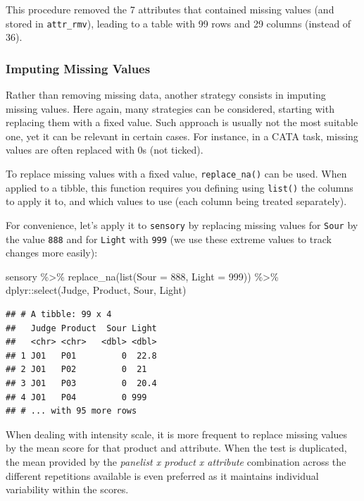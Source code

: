 \documentclass[
]{krantz}
\makeatletter
\newenvironment{Shaded}{\begin{snugshade}}{\end{snugshade}}
\newcommand{\AttributeTok}[1]{\textcolor[rgb]{0.61,0.61,0.61}{#1}}
\newcommand{\DecValTok}[1]{\textcolor[rgb]{0.06,0.06,0.06}{#1}}
\newcommand{\FunctionTok}[1]{\textcolor[rgb]{0,0,0}{#1}}
\newcommand{\NormalTok}[1]{#1}
\newcommand{\SpecialCharTok}[1]{\textcolor[rgb]{0,0,0}{#1}}
\newenvironment{kframe}{%
\medskip{}
\setlength{\fboxsep}{.8em}
 \def\at@end@of@kframe{}%
 \ifinner\ifhmode%
  \def\at@end@of@kframe{\end{minipage}}%
  \begin{minipage}{\columnwidth}%
 \fi\fi%
 \def\FrameCommand##1{\hskip\@totalleftmargin \hskip-\fboxsep
 \colorbox{shadecolor}{##1}\hskip-\fboxsep
     \hskip-\linewidth \hskip-\@totalleftmargin \hskip\columnwidth}%
 \MakeFramed {\advance\hsize-\width
   \@totalleftmargin\z@ \linewidth\hsize
   \@setminipage}}%
 {\par\unskip\endMakeFramed%
 \at@end@of@kframe}
\renewenvironment{Shaded}{\begin{kframe}}{\end{kframe}}
\makeatother
\begin{document}
This procedure removed the 7 attributes that contained missing values (and stored in \texttt{attr\_rmv}), leading to a table with 99 rows and 29 columns (instead of 36).

\hypertarget{imputing-missing-values}{%
\subsubsection{Imputing Missing Values}\label{imputing-missing-values}}

Rather than removing missing data, another strategy consists in imputing missing values. Here again, many strategies can be considered, starting with replacing them with a fixed value. Such approach is usually not the most suitable one, yet it can be relevant in certain cases. For instance, in a CATA task, missing values are often replaced with 0s (not ticked).

To replace missing values with a fixed value, \texttt{replace\_na()} can be used. When applied to a tibble, this function requires you defining using \texttt{list()} the columns to apply it to, and which values to use (each column being treated separately).

For convenience, let's apply it to \texttt{sensory} by replacing missing values for \texttt{Sour} by the value \texttt{888} and for \texttt{Light} with \texttt{999} (we use these extreme values to track changes more easily):

\begin{Shaded}
\begin{Highlighting}[]
\NormalTok{sensory }\SpecialCharTok{\%\textgreater{}\%} 
  \FunctionTok{replace\_na}\NormalTok{(}\FunctionTok{list}\NormalTok{(}\AttributeTok{Sour =} \DecValTok{888}\NormalTok{, }\AttributeTok{Light =} \DecValTok{999}\NormalTok{)) }\SpecialCharTok{\%\textgreater{}\%} 
\NormalTok{  dplyr}\SpecialCharTok{::}\FunctionTok{select}\NormalTok{(Judge, Product, Sour, Light)}
\end{Highlighting}
\end{Shaded}

\begin{verbatim}
## # A tibble: 99 x 4
##   Judge Product  Sour Light
##   <chr> <chr>   <dbl> <dbl>
## 1 J01   P01         0  22.8
## 2 J01   P02         0  21  
## 3 J01   P03         0  20.4
## 4 J01   P04         0 999  
## # ... with 95 more rows
\end{verbatim}

When dealing with intensity scale, it is more frequent to replace missing values by the mean score for that product and attribute. When the test is duplicated, the mean provided by the \emph{panelist x product x attribute} combination across the different repetitions available is even preferred as it maintains individual variability within the scores.
\end{document}
